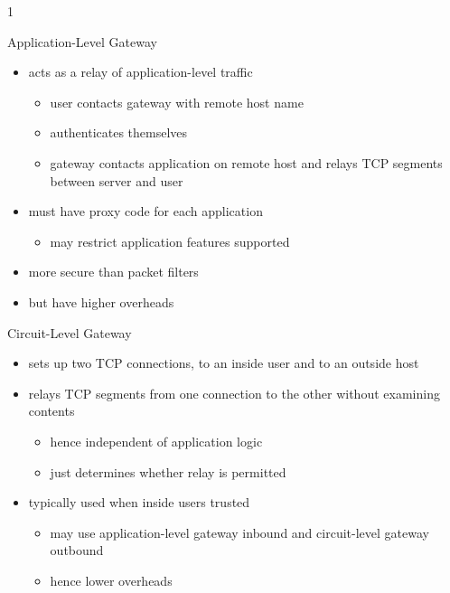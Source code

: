 1\documentclass{beamer}
\begin{document}
\begin{frame}{Application-Level Gateway}
  \begin{itemize}
  \item acts as a relay of application-level traffic 
    \begin{itemize}
    \item user contacts gateway with remote host name 
    \item authenticates themselves 
    \item gateway contacts application on remote host and 
      relays TCP segments between server and user 
    \end{itemize}
  \item must have proxy code for each application 
    \begin{itemize}
    \item may restrict application features supported 
    \end{itemize}
  \item more secure than packet filters 
  \item but have higher overheads 
  \end{itemize}
\end{frame}

\begin{frame}{Circuit-Level Gateway}
  \begin{itemize}
  \item sets up two TCP connections, to an inside user 
    and to an outside host 
  \item relays TCP segments from one connection to 
    the other without examining contents 
    \begin{itemize}
    \item hence independent of application logic 
    \item just determines whether relay is permitted 
    \end{itemize}
  \item typically used when inside users trusted 
    \begin{itemize}
    \item may use application-level gateway inbound and 
      circuit-level gateway outbound 
    \item hence lower overheads
    \end{itemize}
  \end{itemize}
\end{frame}
\end{document}

